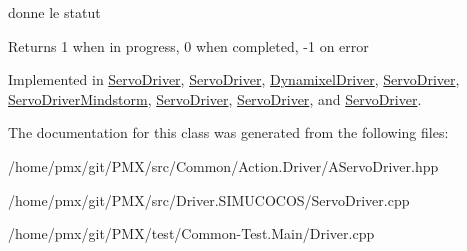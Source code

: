 donne le statut 

\begin{DoxyReturn}{Returns}
1 when in progress, 0 when completed, -\/1 on error 
\end{DoxyReturn}


Implemented in \hyperlink{classServoDriver_a0a8e84f0bbcff39549ddfc239f1a6237}{Servo\+Driver}, \hyperlink{classServoDriver_a0a8e84f0bbcff39549ddfc239f1a6237}{Servo\+Driver}, \hyperlink{classDynamixelDriver_a142a774bb716628483fa010727b84cdb}{Dynamixel\+Driver}, \hyperlink{classServoDriver_a0a8e84f0bbcff39549ddfc239f1a6237}{Servo\+Driver}, \hyperlink{classServoDriverMindstorm_acdb0988017ed22bad0bb3dcc848f03f1}{Servo\+Driver\+Mindstorm}, \hyperlink{classServoDriver_a0a8e84f0bbcff39549ddfc239f1a6237}{Servo\+Driver}, \hyperlink{classServoDriver_a0a8e84f0bbcff39549ddfc239f1a6237}{Servo\+Driver}, and \hyperlink{classServoDriver_a0a8e84f0bbcff39549ddfc239f1a6237}{Servo\+Driver}.



The documentation for this class was generated from the following files\+:\begin{DoxyCompactItemize}
\item 
/home/pmx/git/\+P\+M\+X/src/\+Common/\+Action.\+Driver/A\+Servo\+Driver.\+hpp\item 
/home/pmx/git/\+P\+M\+X/src/\+Driver.\+S\+I\+M\+U\+C\+O\+C\+O\+S/Servo\+Driver.\+cpp\item 
/home/pmx/git/\+P\+M\+X/test/\+Common-\/\+Test.\+Main/Driver.\+cpp\end{DoxyCompactItemize}
